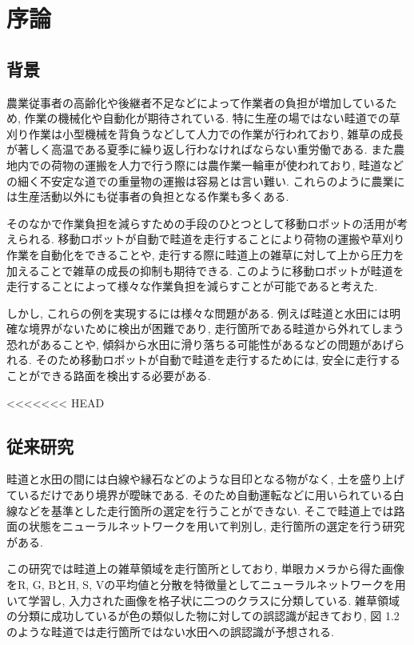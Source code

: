 \chapter{序論}
\section{背景}
農業従事者の高齢化や後継者不足などによって作業者の負担が増加しているため, 作業の機械化や自動化が期待されている. 
特に生産の場ではない畦道での草刈り作業は小型機械を背負うなどして人力での作業が行われており, 雑草の成長が著しく高温である夏季に繰り返し行わなければならない重労働である. 
また農地内での荷物の運搬を人力で行う際には農作業一輪車が使われており, 畦道などの細く不安定な道での重量物の運搬は容易とは言い難い. 
これらのように農業には生産活動以外にも従事者の負担となる作業も多くある.  

そのなかで作業負担を減らすための手段のひとつとして移動ロボットの活用が考えられる. 
移動ロボットが自動で畦道を走行することにより荷物の運搬や草刈り作業を自動化をできることや, 
走行する際に畦道上の雑草に対して上から圧力を加えることで雑草の成長の抑制も期待できる\cite{稲垣栄洋2017踏圧処理が畦畔雑草植生に及ぼす影響}. 
このように移動ロボットが畦道を走行することによって様々な作業負担を減らすことが可能であると考えた. 

しかし, これらの例を実現するには様々な問題がある.  
例えば畦道と水田には明確な境界がないために検出が困難であり, 走行箇所である畦道から外れてしまう恐れがあることや, 
傾斜から水田に滑り落ちる可能性があるなどの問題があげられる. 
そのため移動ロボットが自動で畦道を走行するためには, 安全に走行することができる路面を検出する必要がある.


<<<<<<< HEAD

\section{従来研究}

畦道と水田の間には白線や縁石などのような目印となる物がなく, 土を盛り上げているだけであり境界が曖昧である. 
そのため自動運転などに用いられている白線などを基準とした走行箇所の選定を行うことができない. 
そこで畦道上では路面の状態をニューラルネットワークを用いて判別し, 
走行箇所の選定を行う研究\cite{長橋孝哉2019ニューラルネットワークを用いた畦道の雑草検出に関する研究}がある.  

この研究では畦道上の雑草領域を走行箇所としており, 
単眼カメラから得た画像をR, G, BとH, S, Vの平均値と分散を特徴量としてニューラルネットワークを用いて学習し, 
入力された画像を格子状に二つのクラスに分類している. 
雑草領域の分類に成功しているが色の類似した物に対しての誤認識が起きており, 図 1.2のような畦道では走行箇所ではない水田への誤認識が予想される. 

